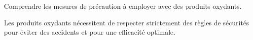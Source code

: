 \tetePremStssRedo
\vspace*{-36pt}

\begin{objectifs}
  \item Comprendre les mesures de précaution à employer avec des produits oxydants.
\end{objectifs}

\begin{contexte}
  Les produits oxydants nécessitent de respecter strictement des règles de sécurités pour éviter des accidents et pour une efficacité optimale.
  
\end{contexte}


